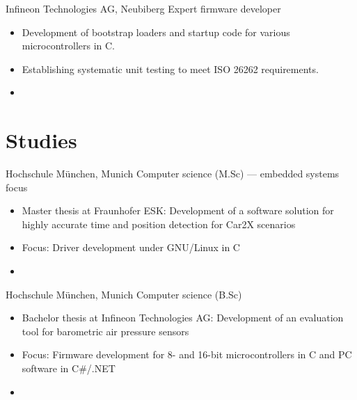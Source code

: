\documentclass[%
               doublesided,
               paper=a4,
               fontsize=10pt
              ]{my-resume}
\begin{document}
{    
        {Infineon Technologies AG, Neubiberg}
        {Expert firmware developer}
        {\begin{itemize}
            \item Development of bootstrap loaders and startup code for various microcontrollers in C.
            \item Establishing systematic unit testing to meet ISO 26262 requirements.
            \item[]   
        \end{itemize}}
    
    \section[\faMortarBoard]{Studies}
        {Hochschule München, Munich}
        {Computer science (M.Sc) --- embedded systems focus}
        {\begin{itemize}
            \item Master thesis at Fraunhofer ESK: Development of a software solution for highly accurate time and position detection for Car2X scenarios
            \item Focus: Driver development under GNU/Linux in C
            \item[]  
        \end{itemize}}
    
        {Hochschule München, Munich}
        {Computer science (B.Sc)}
        {\begin{itemize}
            \item Bachelor thesis at Infineon Technologies AG: Development of an evaluation tool for barometric air pressure sensors
            \item Focus: Firmware development for 8- and 16-bit microcontrollers in C and PC software in C\#/.NET
            \item[]   
        \end{itemize}}

}
\makebody
\clearpage
\end{document}
